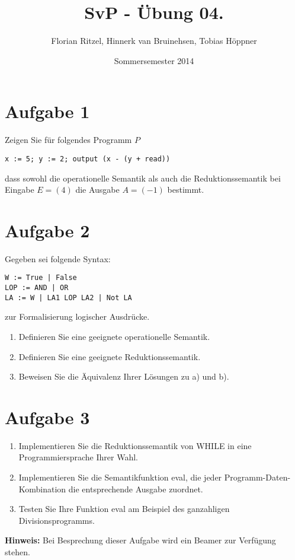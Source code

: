 \documentclass[ngerman,a4paper]{report}
\author{Florian Ritzel, Hinnerk van Bruinehsen, Tobias Höppner}
\title{SvP - Übung 04. }
\date{Sommersemester 2014}
\renewcommand{\maketitle}{}
\begin{document}
\maketitle
\section*{Aufgabe 1}
Zeigen Sie für folgendes Programm $P$
\begin{lstlisting}
x := 5; y := 2; output (x - (y + read))
\end{lstlisting}
dass sowohl die operationelle Semantik als auch die Reduktionssemantik bei Eingabe $E = (4)$ die Ausgabe $A = (-1)$ bestimmt.
\section*{Aufgabe 2}
Gegeben sei folgende Syntax:
\begin{lstlisting}
W := True | False
LOP := AND | OR
LA := W | LA1 LOP LA2 | Not LA
\end{lstlisting}
zur Formalisierung logischer Ausdrücke.
\begin{enumerate}
\item Definieren Sie eine geeignete operationelle Semantik.
\item Definieren Sie eine geeignete Reduktionssemantik.
\item Beweisen Sie die Äquivalenz Ihrer Lösungen zu a) und b).
\end{enumerate}
\section*{Aufgabe 3 }
\begin{enumerate}
	\item Implementieren Sie die Reduktionssemantik von WHILE in eine Programmiersprache Ihrer Wahl.
	\item Implementieren Sie die Semantikfunktion eval, die jeder Programm-Daten-Kombination die entsprechende Ausgabe zuordnet.
	\item Testen Sie Ihre Funktion eval am Beispiel des ganzahligen Divisionsprogramms.
\end{enumerate}
\textbf{Hinweis:} Bei Besprechung dieser Aufgabe wird ein Beamer zur Verfügung stehen.
\end{document}
